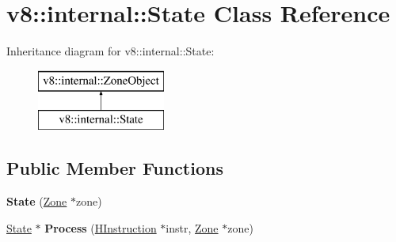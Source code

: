 \hypertarget{classv8_1_1internal_1_1_state}{}\section{v8\+:\+:internal\+:\+:State Class Reference}
\label{classv8_1_1internal_1_1_state}
Inheritance diagram for v8\+:\+:internal\+:\+:State\+:\begin{figure}[H]
\begin{center}
\leavevmode
\includegraphics[height=2.000000cm]{classv8_1_1internal_1_1_state}
\end{center}
\end{figure}
\subsection*{Public Member Functions}
\begin{DoxyCompactItemize}
\item 
\hypertarget{classv8_1_1internal_1_1_state_a9073e7e20a71bfd62fe96a3cefeee4eb}{}{\bfseries State} (\hyperlink{classv8_1_1internal_1_1_zone}{Zone} $\ast$zone)\label{classv8_1_1internal_1_1_state_a9073e7e20a71bfd62fe96a3cefeee4eb}

\item 
\hypertarget{classv8_1_1internal_1_1_state_ada96dfe0c2aa4eb2f48b5c58f43aa0fc}{}\hyperlink{classv8_1_1internal_1_1_state}{State} $\ast$ {\bfseries Process} (\hyperlink{classv8_1_1internal_1_1_h_instruction}{H\+Instruction} $\ast$instr, \hyperlink{classv8_1_1internal_1_1_zone}{Zone} $\ast$zone)\label{classv8_1_1internal_1_1_state_ada96dfe0c2aa4eb2f48b5c58f43aa0fc}

\end{DoxyCompactItemize}
